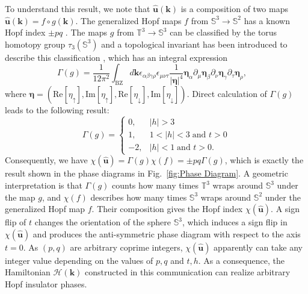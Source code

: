 \documentclass[twocolumn,prb,aps,epsfig,superscriptaddress,showpacs]{revtex4-1}
\begin{document}
To understand this result, we note that $\hat{\mathbf{u}}(\mathbf{k})$ is a
composition of two maps $\hat{\mathbf{u}}(\mathbf{k})=f\circ g(\mathbf{k})$.
The generalized Hopf maps $f$ from $\mathbb{S}^{3}\rightarrow \mathbb{S}^{2}$
has a known Hopf index $\pm pq$ \cite{1947Whitehead}. The maps $g$ from $%
\mathbb{T}^{3}\rightarrow \mathbb{S}^{3}$ can be classified by the torus
homotopy group $\tau _{3}(\mathbb{S}^{3})$ and a topological invariant has
been introduced to describe this classification \cite{2012Neupert}, which
has an integral expression
\begin{equation*}
\Gamma(g) =\frac{1}{12\pi ^{2}}\int_{\text{BZ}}d\mathbf{k}\epsilon _{\alpha
\beta \gamma \rho }\epsilon _{\mu \nu \tau }\frac{1}{|\bm{\eta}|^{4}}%
\bm{\eta}_{\alpha }\partial _{\mu }\bm{\eta}_{\beta }\partial _{\nu }%
\bm{\eta}_{\gamma }\partial _{\tau }\bm{\eta}_{\rho },\quad
\end{equation*}%
where $\bm{\eta}=(\text{Re}[\eta _{\uparrow }],\text{Im}[\eta _{\uparrow }],%
\text{Re}[\eta _{\downarrow }],\text{Im}[\eta _{\downarrow }])$. Direct
calculation of $\Gamma (g)$ leads to the following result:
\begin{equation*}
\Gamma (g)=%
\begin{cases}
0, & |h|>3 \\
1, & 1<|h|<3\;\text{and }t>0 \\
-2, & |h|<1\;\text{and }t>0.%
\end{cases}%
\end{equation*}%
Consequently, we have $\chi (\hat{\mathbf{u}})=\Gamma (g)\chi (f)=\pm
pq\Gamma (g)$, which is exactly the result shown in the phase diagrams in
Fig.\ \ref{fig:Phase Diagram}. A geometric interpretation is that $\Gamma
(g) $ counts how many times $\mathbb{T}^{3}$ wraps around $\mathbb{S}^{3}$
under the map $g$, and $\chi (f)$ describes how many times $\mathbb{S}^{3}$
wraps around $\mathbb{S}^{2}$ under the generalized Hopf map $f$. Their
composition gives the Hopf index $\chi (\hat{\mathbf{u}})$. A sign flip of $%
t $ changes the orientation of the sphere $\mathbb{S}^{3}$, which induces a
sign flip in $\chi (\hat{\mathbf{u}})$ and produces the anti-symmetric phase
diagram with respect to the axis $t=0$. As $(p,q)$ are arbitrary coprime
integers, $\chi (\hat{\mathbf{u}})$ apparently can take any integer value
depending on the values of $p,q$ and $t,h$. As a consequence, the
Hamiltonian $\mathcal{H}(\mathbf{k})$ constructed in this communication can realize
arbitrary Hopf insulator phases.
\end{document}
